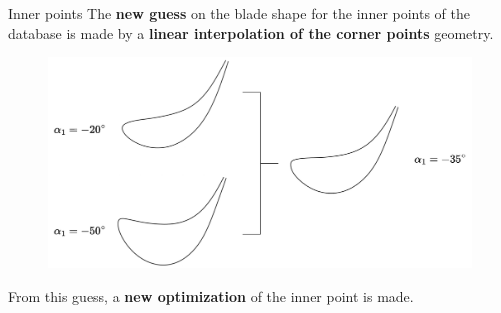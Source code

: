 \begin{frame}{Inner points}
    The \textbf{new guess} on the blade shape for the inner points of the database is made by a \textbf{linear interpolation of the corner points} geometry.
    \begin{figure}
        \centering
        \includegraphics[page=1, scale=0.2]{./pdf/innerGeometry.pdf}
    \end{figure}
    From this guess, a \textbf{new optimization} of the inner point is made.
\end{frame}

